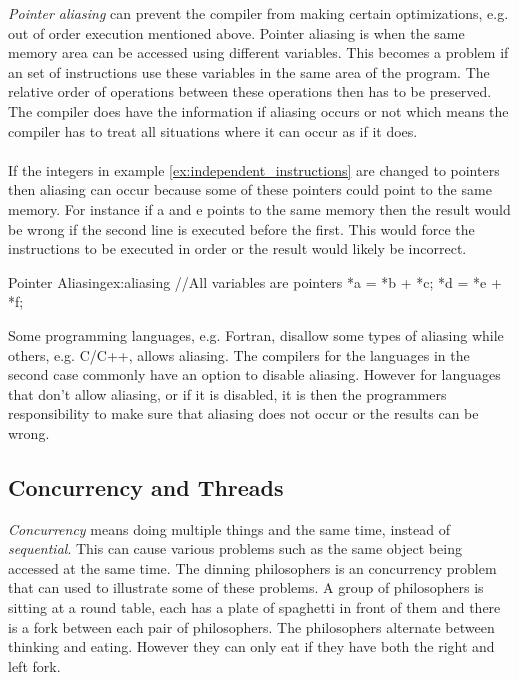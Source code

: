 \documentclass[10pt,a4paper]{report}
\newcounter{example}
\begin{document}
\emph{Pointer aliasing} can prevent the compiler from making certain optimizations, e.g. out of order execution mentioned above. Pointer aliasing is when the same memory area can be accessed using different variables\cite{introduction_hpc_hager}. This becomes a problem if an set of instructions use these variables in the same area of the program. The relative order of operations between these operations then has to be preserved. The compiler does have the information if aliasing occurs or not which means the compiler has to treat all situations where it can occur as if it does\cite{introduction_hpc_hager}.\\
\\
If the integers in example \ref{ex:independent_instructions} are changed to pointers then aliasing can occur because some of these pointers could point to the same memory. For instance if a and e points to the same memory then the result would be wrong if the second line is executed before the first. This would force the instructions to be executed in order or the result would likely be incorrect.

\begin{example}{Pointer Aliasing}{ex:aliasing}
//All variables are pointers
*a = *b + *c;
*d = *e + *f;
\end{example}

Some programming languages, e.g. Fortran, disallow some types of aliasing while others, e.g. C/C++, allows aliasing\cite{introduction_hpc_hager}. The compilers for the languages in the second case commonly have an option to disable aliasing. However for languages that don't allow aliasing, or if it is disabled, it is then the programmers responsibility to make sure that aliasing does not occur or the results can be wrong\cite{introduction_hpc_hager}.

\newpage
\subsection{Concurrency and Threads}
\label{concurrency}
\emph{Concurrency} means doing multiple things and the same time, instead of \emph{sequential}. This can cause various problems such as the same object being accessed at the same time. The dinning philosophers is an concurrency problem that can used to illustrate some of these problems. A group of philosophers is sitting at a round table, each has a plate of spaghetti in front of them and there is a fork between each pair of philosophers\cite{hoare1985communicating}. The philosophers alternate between thinking and eating. However they can only eat if they have both the right and left fork\cite{hoare1985communicating}.
\end{document}
